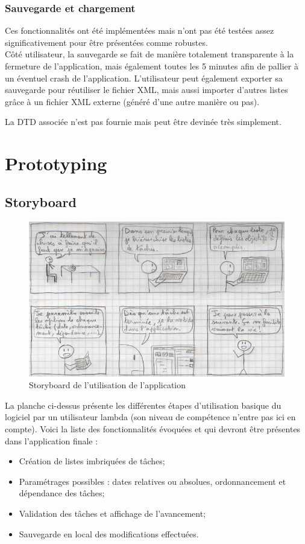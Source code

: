 		\subsection{Sauvegarde et chargement}
			Ces fonctionnalités ont été implémentées mais n'ont pas été testées assez significativement pour être présentées comme robustes.\\
			
			Côté utilisateur, la sauvegarde se fait de manière totalement transparente à la fermeture de l'application, mais également toutes les 5 minutes afin de pallier à un éventuel crash de l'application. L'utilisateur peut également exporter sa sauvegarde pour réutiliser le fichier XML, mais aussi importer d'autres listes grâce à un fichier XML externe (généré d'une autre manière ou pas).
			
			La DTD associée n'est pas fournie mais peut être devinée très simplement.


\chapter{Prototyping}

	\section{Storyboard}
		\begin{figure}[h!]
		   \includegraphics{img/stotyboard_ihm.png}
		   \caption{Storyboard de l'utilisation de l'application}
		\end{figure}
	
		La planche ci-dessus présente les différentes étapes d'utilisation basique du logiciel par un utilisateur lambda (son niveau de compétence n'entre pas ici en compte). Voici la liste des fonctionnalités évoquées et qui devront être présentes dans l'application finale :
		\begin{itemize}
			\item Création de listes imbriquées de tâches;
			\item Paramétrages possibles : dates relatives ou absolues, ordonnancement et dépendance des tâches;
			\item Validation des tâches et affichage de l'avancement;
			\item Sauvegarde en local des modifications effectuées.
		\end{itemize}
		
